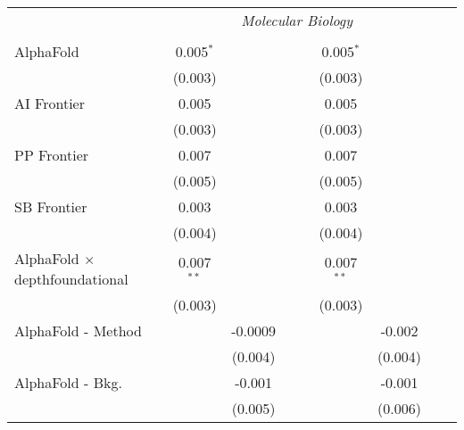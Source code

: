 \begin{tabular}{lcccccccc}
 & \multicolumn{6}{c}{\textit{Molecular Biology}} \\ \\
   AlphaFold                                      & 0.005$^{*}$  &                &       &       & 0.005$^{*}$  &                &       &   \\   
                                                  & (0.003)      &                &       &       & (0.003)      &                &       &   \\   
   AI Frontier                                    & 0.005        &                &       &       & 0.005        &                &       &   \\   
                                                  & (0.003)      &                &       &       & (0.003)      &                &       &   \\   
   PP Frontier                                    & 0.007        &                &       &       & 0.007        &                &       &   \\   
                                                  & (0.005)      &                &       &       & (0.005)      &                &       &   \\   
   SB Frontier                                    & 0.003        &                &       &       & 0.003        &                &       &   \\   
                                                  & (0.004)      &                &       &       & (0.004)      &                &       &   \\   
   AlphaFold $\times$ depthfoundational           & 0.007$^{**}$ &                &       &       & 0.007$^{**}$ &                &       &   \\   
                                                  & (0.003)      &                &       &       & (0.003)      &                &       &   \\   
   AlphaFold - Method                             &              & -0.0009        &       &       &              & -0.002         &       &   \\   
                                                  &              & (0.004)        &       &       &              & (0.004)        &       &   \\   
   AlphaFold - Bkg.                               &              & -0.001         &       &       &              & -0.001         &       &   \\   
                                                  &              & (0.005)        &       &       &              & (0.006)        &       &   \\   

\end{tabular}
